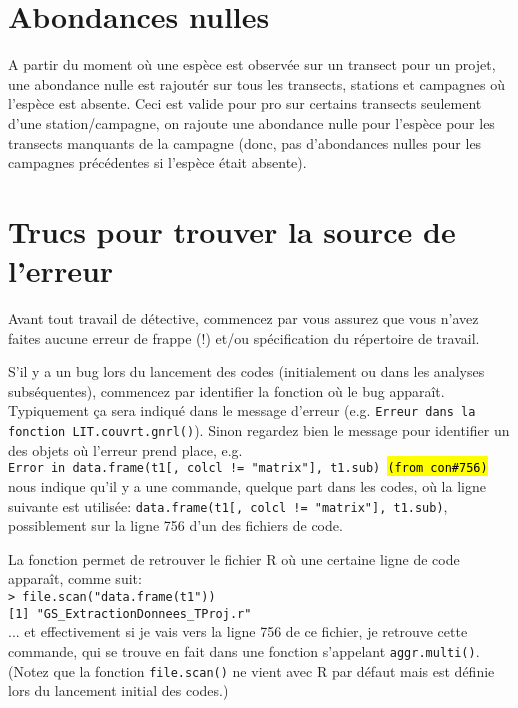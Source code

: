 \documentclass{article}
\begin{document}
\section{Abondances nulles}
A partir du moment où une espèce est observée sur un transect pour un
projet, une abondance nulle est rajoutér sur tous les transects,
stations et campagnes où l'espèce est absente. Ceci est valide pour   pro sur certains
transects seulement d'une station/campagne, on rajoute une abondance
nulle pour l'espèce pour les transects manquants de la campagne (donc,
pas d'abondances nulles pour les campagnes précédentes si l'espèce
était absente).

\section{Trucs pour trouver la source de l'erreur}

Avant tout travail de détective, commencez par vous assurez que vous
n'avez faites aucune erreur de frappe (!) et/ou spécification du
répertoire de travail.

S'il y a un bug lors du lancement des codes (initialement ou dans les
analyses subséquentes), commencez par identifier la fonction où le bug
apparaît. Typiquement ça sera indiqué dans le message d'erreur
(e.g. \texttt{Erreur dans la fonction LIT.couvrt.gnrl()}). Sinon
regardez bien le message pour identifier un des objets où l'erreur
prend place, e.g. \\

\texttt{Error in data.frame(t1[, colcl != "matrix"], t1.sub)
\hl{(from con\#756)}}\\

nous indique qu'il y a une commande, quelque part dans les codes, où
la ligne suivante est utilisée: \texttt{data.frame(t1[, colcl !=
  "matrix"], t1.sub)}, possiblement sur la ligne 756 d'un des fichiers
de code.

La fonction  permet de retrouver le fichier R où
une certaine ligne de code apparaît, comme suit: \\
\texttt{> file.scan("data.frame(t1"))}\\
\texttt{[1] "GS\_ExtractionDonnees\_TProj.r"}\\

... et effectivement si je vais vers la ligne 756 de ce fichier, je
retrouve cette commande, qui se trouve en fait dans une fonction
s'appelant \texttt{aggr.multi()}. (Notez que la fonction \texttt{file.scan()}
ne vient avec R par défaut mais est définie lors du lancement initial
des codes.)
\end{document}
